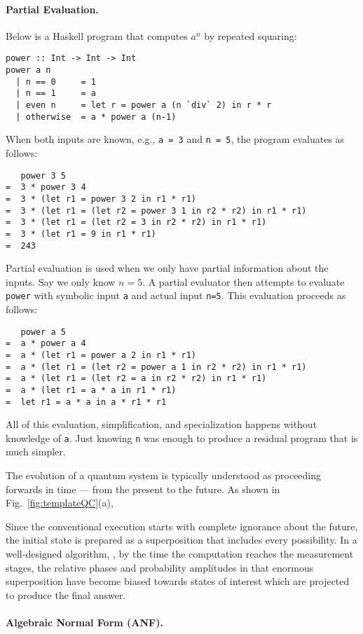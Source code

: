 \documentclass{article}
\begin{document}
\paragraph*{Partial Evaluation.}
Below is a Haskell program that computes $a^n$ by repeated squaring:
\begin{verbatim}
power :: Int -> Int -> Int
power a n
  | n == 0     = 1
  | n == 1     = a
  | even n     = let r = power a (n `div` 2) in r * r 
  | otherwise  = a * power a (n-1)
\end{verbatim}
When both inputs are known, e.g., \verb|a = 3| and \verb|n = 5|, the
program evaluates as follows:
\begin{verbatim}
   power 3 5
=  3 * power 3 4
=  3 * (let r1 = power 3 2 in r1 * r1)
=  3 * (let r1 = (let r2 = power 3 1 in r2 * r2) in r1 * r1)
=  3 * (let r1 = (let r2 = 3 in r2 * r2) in r1 * r1)
=  3 * (let r1 = 9 in r1 * r1)
=  243
\end{verbatim}

Partial evaluation is used when we only have partial information about
the inputs. Say we only know $n=5$. A partial evaluator then attempts
to evaluate \verb|power| with symbolic input \verb|a| and actual input
\verb|n=5|. This evaluation proceeds as follows:
\begin{verbatim}
   power a 5 
=  a * power a 4 
=  a * (let r1 = power a 2 in r1 * r1)
=  a * (let r1 = (let r2 = power a 1 in r2 * r2) in r1 * r1)
=  a * (let r1 = (let r2 = a in r2 * r2) in r1 * r1)
=  a * (let r1 = a * a in r1 * r1)
=  let r1 = a * a in a * r1 * r1
\end{verbatim}
All of this evaluation, simplification, and specialization happens
without knowledge of \verb|a|. Just knowing \verb|n| was enough to
produce a residual program that is much simpler. 

The evolution of a quantum system is typically understood as
proceeding forwards in time --- from the present to the future. As
shown in Fig.~\ref{fig:templateQC}(a), 

Since the conventional execution starts with complete ignorance about
the future, the initial state is prepared as a superposition that
includes every possibility. In a well-designed algorithm, , by the
time the computation reaches the measurement stages, the relative
phases and probability amplitudes in that enormous superposition have
become biased towards states of interest which are projected to
produce the final answer.

\paragraph*{Algebraic Normal Form (ANF).}
\label{para:anf}
\end{document}

